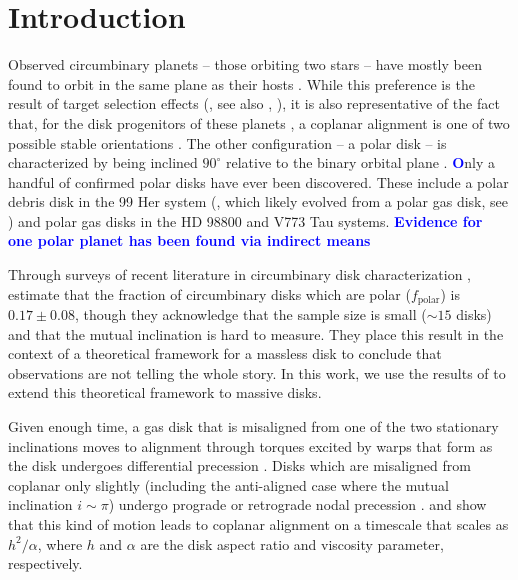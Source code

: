 \documentclass[twocolumn,linenumbers]{aastex631}
\newcommand{\RR}[1]{\textcolor{blue}{\bf#1}} %
\begin{document}

\section{Introduction}
\label{sec:intro}


Observed circumbinary planets -- those orbiting two stars -- have mostly been found to orbit in the same plane as their hosts \citep{doyle2011,orosz2012,welsh2012}. While this preference is the result of target selection effects (\citealt{martin2014}, see also \citealt{martin2015}, \citealt{martin2017a}), it is also representative of the fact that, for the disk progenitors of these planets \citep[from which the planets inherit orbital parameters, see][]{childs2021}, a coplanar alignment is one of two possible stable orientations \citep{bate2000,lubow2000}. The other configuration -- a polar disk -- is characterized by being inclined $90^\circ$ relative to the binary orbital plane \citep{aly2015,martin2017}. \RR{O}nly a handful of confirmed polar disks have ever been discovered. These include a polar debris disk in the 99 Her system (\citealt{kennedy2012}, which likely evolved from a polar gas disk, see \citealt{smallwood2020}) and polar gas disks in the HD 98800 \citep{kennedy2019} and V773 Tau \citep{kenworthy2022} systems. \RR{Evidence for one polar planet has been found via indirect means \citep[AC Her, ][]{hillen2015,anugu2023,martin2023}}

Through surveys of recent literature in circumbinary disk characterization \citep{czekala2019,zurlo2023}, \citet{ceppi2024} estimate that the fraction of circumbinary disks which are polar ($f_\text{polar}$) is $0.17 \pm 0.08$, though they acknowledge that the sample size is small ($\sim 15$ disks) and that the mutual inclination is hard to measure. They place this result in the context of a theoretical framework for a massless disk \citep{farago2010,lubow2018,zanazzi2018} to conclude that observations are not telling the whole story. In this work, we use the results of \citet{martin2019} to extend this theoretical framework to massive disks.

Given enough time, a gas disk that is misaligned from one of the two stationary inclinations moves to alignment through torques excited by warps that form as the disk undergoes differential precession \citep{bate2000,lubow2000}. Disks which are misaligned from coplanar only slightly (including the anti-aligned case where the mutual inclination $i\sim\pi$) undergo prograde or retrograde nodal precession \citep{papaloizou1995}. \citet{bate2000} and \citet{lubow2000} show that this kind of motion leads to coplanar alignment on a timescale that scales as $h^2/\alpha$, where $h$ and $\alpha$ are the disk aspect ratio and viscosity parameter, respectively.
\end{document}
